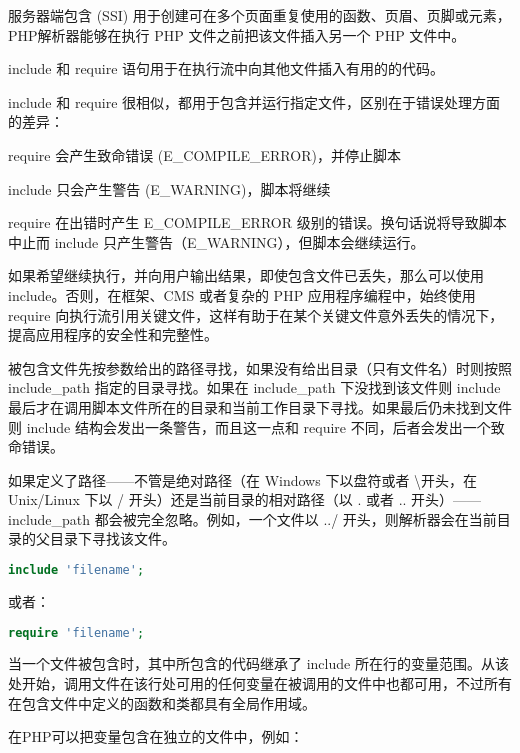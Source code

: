 服务器端包含 (SSI) 用于创建可在多个页面重复使用的函数、页眉、页脚或元素，PHP解析器能够在执行 PHP 文件之前把该文件插入另一个 PHP 文件中。

include 和 require 语句用于在执行流中向其他文件插入有用的的代码。

include 和 require 很相似，都用于包含并运行指定文件，区别在于错误处理方面的差异：

\begin{compactitem}
\item require 会产生致命错误 (E\_COMPILE\_ERROR)，并停止脚本
\item include 只会产生警告 (E\_WARNING)，脚本将继续
\end{compactitem}

require 在出错时产生 E\_COMPILE\_ERROR 级别的错误。换句话说将导致脚本中止而 include 只产生警告（E\_WARNING），但脚本会继续运行。

如果希望继续执行，并向用户输出结果，即使包含文件已丢失，那么可以使用 include。否则，在框架、CMS 或者复杂的 PHP 应用程序编程中，始终使用 require 向执行流引用关键文件，这样有助于在某个关键文件意外丢失的情况下，提高应用程序的安全性和完整性。

被包含文件先按参数给出的路径寻找，如果没有给出目录（只有文件名）时则按照 include\_path 指定的目录寻找。如果在 include\_path 下没找到该文件则 include 最后才在调用脚本文件所在的目录和当前工作目录下寻找。如果最后仍未找到文件则 include 结构会发出一条警告，而且这一点和 require 不同，后者会发出一个致命错误。

如果定义了路径——不管是绝对路径（在 Windows 下以盘符或者 \textbackslash 开头，在 Unix/Linux 下以 / 开头）还是当前目录的相对路径（以 . 或者 .. 开头）——include\_path 都会被完全忽略。例如，一个文件以 ../ 开头，则解析器会在当前目录的父目录下寻找该文件。

\begin{lstlisting}[language=PHP]
include 'filename';
\end{lstlisting}

或者：

\begin{lstlisting}[language=PHP]
require 'filename';
\end{lstlisting}

当一个文件被包含时，其中所包含的代码继承了 include 所在行的变量范围。从该处开始，调用文件在该行处可用的任何变量在被调用的文件中也都可用，不过所有在包含文件中定义的函数和类都具有全局作用域。





在PHP可以把变量包含在独立的文件中，例如：

